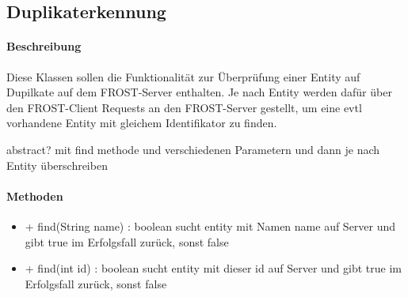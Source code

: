 \subsection{Duplikaterkennung}

\paragraph{Beschreibung}
Diese Klassen sollen die Funktionalität zur Überprüfung einer Entity auf Dupilkate auf dem FROST-Server enthalten.
Je nach Entity werden dafür über den FROST-Client Requests an den FROST-Server gestellt, um eine evtl vorhandene Entity mit gleichem Identifikator zu finden.

abstract? mit find methode und verschiedenen Parametern und dann je nach Entity überschreiben


\paragraph{Methoden}
\begin{itemize}
\item + find(String name) : boolean
sucht entity mit Namen name auf Server und gibt true im Erfolgsfall zurück, sonst false
\item + find(int id) : boolean
sucht entity mit dieser id auf Server und gibt true im Erfolgsfall zurück, sonst false
\end{itemize}
